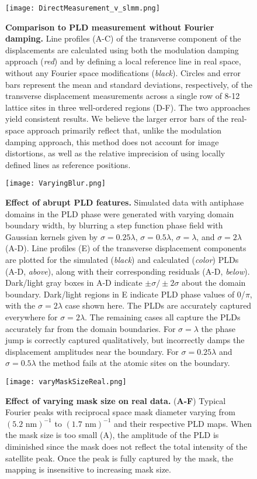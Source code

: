 \documentclass[12pt]{article}
\begin{document}
\begin{figure}
  \texttt{[image: DirectMeasurement\_v\_slmm.png]}
  \caption{\textbf{Comparison to PLD measurement without Fourier damping.} 
Line profiles (A-C) of the transverse component of the displacements are calculated using both the modulation damping approach (\textit{red}) and by defining a local reference line in real space, without any Fourier space modifications (\textit{black}).
Circles and error bars represent the mean and standard deviations, respectively, of the transverse displacement measurements across a single row of 8-12 lattice sites in three well-ordered regions (D-F).
The two approaches yield consistent results.
We believe the larger error bars of the real-space approach primarily reflect that, unlike the modulation damping approach, this method does not account for image distortions, as well as the relative imprecision of using locally defined lines as reference positions.}
  \label{F:DirectMeasurement}
\end{figure}

\clearpage

\begin{figure}
  \texttt{[image: VaryingBlur.png]}
  \caption{\textbf{Effect of abrupt PLD features.} 
Simulated data with antiphase domains in the PLD phase were generated with varying domain boundary width, by blurring a step function phase field with Gaussian kernels given by $\sigma=0.25\lambda$, $\sigma=0.5\lambda$, $\sigma=\lambda$, and $\sigma=2\lambda$ (A-D).
Line profiles (E) of the transverse displacement components are plotted for the simulated (\textit{black}) and calculated (\textit{color}) PLDs (A-D, \textit{above}), along with their corresponding residuals (A-D, \textit{below}).
Dark/light gray boxes in A-D indicate $\pm\sigma / \pm2\sigma$ about the domain boundary.
Dark/light regions in E indicate PLD phase values of 0/$\pi$, with the $\sigma=2\lambda$ case shown here.
The PLDs are accurately captured everywhere for $\sigma=2\lambda$.
The remaining cases all capture the PLDs accurately far from the domain boundaries.
For $\sigma=\lambda$ the phase jump is correctly captured qualitatively, but incorrectly damps the displacement amplitudes near the boundary.
For $\sigma=0.25\lambda$ and $\sigma=0.5\lambda$ the method fails at the atomic sites on the boundary.}
  \label{F:VaryingBlur}
\end{figure}


\clearpage

\begin{figure}
  \texttt{[image: varyMaskSizeReal.png]}
  \caption{\textbf{Effect of varying mask size on real data.} 
(\textbf{A-F}) Typical Fourier peaks with reciprocal space mask diameter varying from $(5.2\text{ nm})^{-1}$ to $(1.7\text{ nm})^{-1}$ and their respective PLD maps. 
When the mask size is too small (A), the amplitude of the PLD is diminished since the mask does not reflect the total intensity of the satellite peak.
Once the peak is fully captured by the mask, the mapping is insensitive to increasing mask size.
}
\label{F:VaryingMask_real}
\end{figure}
\end{document}
